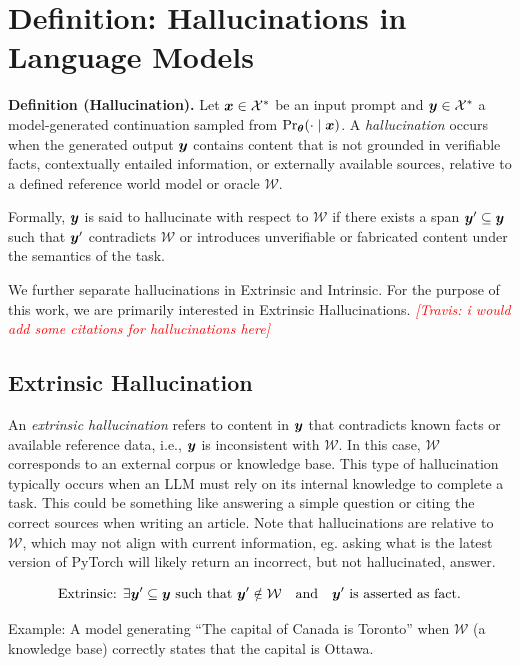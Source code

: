 \documentclass[11pt, oneside]{book}
\newcommand{\cX}{\mathcal{X}}
\theoremstyle{plain}
\theoremstyle{definition}
\theoremstyle{remark}
\newcommand{\travis}[1]{\textcolor{red}{{\it [Travis: #1]}}}
\begin{document}
\section*{Definition: Hallucinations in Language Models}

\textbf{Definition (Hallucination).}
Let $\vx \in \cX^*$ be an input prompt and $\vy \in \cX^*$ a model-generated continuation sampled from $\Pr_{{\bm{\theta}}}(\cdot \mid {\bm{x}})$. A \emph{hallucination} occurs when the generated output ${\bm{y}}$ contains content that is not grounded in verifiable facts, contextually entailed information, or externally available sources, relative to a defined reference world model or oracle $\mathcal{W}$.

Formally, ${\bm{y}}$ is said to hallucinate with respect to $\mathcal{W}$ if there exists a span ${\bm{y}}' \subseteq {\bm{y}}$ such that ${\bm{y}}'$ contradicts $\mathcal{W}$ or introduces unverifiable or fabricated content under the semantics of the task.

We further separate hallucinations in Extrinsic and Intrinsic. For the purpose of this work, we are primarily interested in Extrinsic Hallucinations. \travis{i would add some citations for hallucinations here}

\subsection*{Extrinsic Hallucination}

An \emph{extrinsic hallucination} refers to content in ${\bm{y}}$ that contradicts known facts or available reference data, i.e., ${\bm{y}}$ is inconsistent with $\mathcal{W}$. In this case, $\mathcal{W}$ corresponds to an external corpus or knowledge base. This type of hallucination typically occurs when an LLM must rely on its internal knowledge to complete a task. This could be something like answering a simple question or citing the correct sources when writing an article. Note that hallucinations are relative to $\mathcal{W}$, which may not align with current information, eg. asking what is the latest version of PyTorch will likely return an incorrect, but not hallucinated, answer. 

\[
\text{Extrinsic: } \exists {\bm{y}}' \subseteq {\bm{y}} \text{ such that } {\bm{y}}' \notin \mathcal{W} \quad \text{and} \quad {\bm{y}}' \text{ is asserted as fact}.
\]

Example: A model generating ``The capital of Canada is Toronto'' when $\mathcal{W}$ (a knowledge base) correctly states that the capital is Ottawa.
\end{document}

